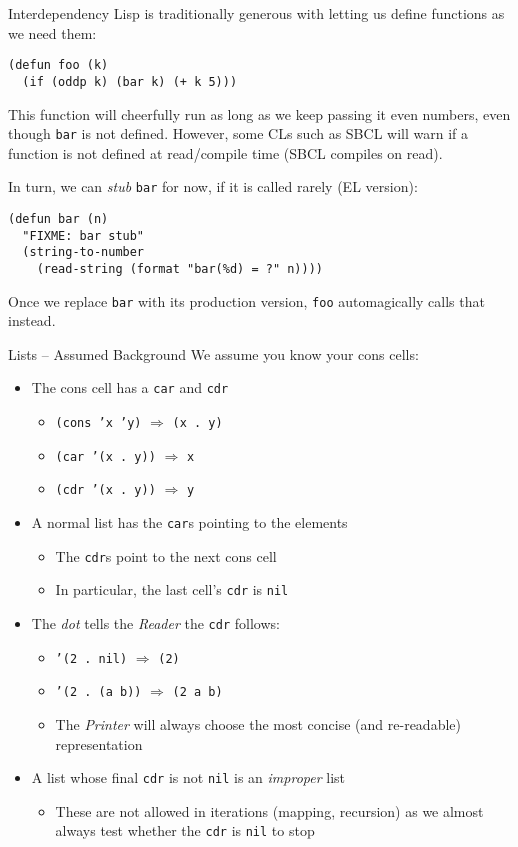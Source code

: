 \documentclass[presentation]{beamer}
\begin{document}
\begin{frame}[fragile]{Interdependency}
  Lisp is traditionally generous with letting us define functions as we need them:
\begin{verbatim}
(defun foo (k)
  (if (oddp k) (bar k) (+ k 5)))
\end{verbatim}
This function will cheerfully run as long as we keep passing it even numbers, even though \texttt{bar} is not defined.  However, some CLs such as SBCL will warn if a function is not defined at read/compile time (SBCL compiles on read).

\medskip
In turn, we can \emph{stub} \texttt{bar} for now, if it is called rarely (EL version):
\begin{verbatim}
(defun bar (n)
  "FIXME: bar stub"
  (string-to-number
    (read-string (format "bar(%d) = ?" n))))
\end{verbatim}
  Once we replace \texttt{bar} with its production version, \texttt{foo} automagically calls that instead.
\end{frame}


\begin{frame}[fragile]{Lists -- Assumed Background}
  We assume you know your cons cells:
  \begin{itemize}
  \item The cons cell has a \texttt{car} and \texttt{cdr}
    \begin{itemize}
    \item \texttt{(cons 'x 'y)} $\Rightarrow$ \texttt{(x . y)} 
    \item \texttt{(car '(x . y))} $\Rightarrow$ \texttt{x} 
    \item \texttt{(cdr '(x . y))} $\Rightarrow$ \texttt{y} 
    \end{itemize}
  \item A normal list has the \texttt{car}s pointing to the elements
    \begin{itemize}
    \item The \texttt{cdr}s point to the next cons cell
    \item In particular, the last cell's \texttt{cdr} is \texttt{nil}
    \end{itemize}
  \item The \emph{dot} tells the \emph{Reader} the \texttt{cdr} follows:
    \begin{itemize}
    \item \texttt{'(2 . nil)} $\Rightarrow$ \texttt{(2)}
    \item \texttt{'(2 . (a b))} $\Rightarrow$ \texttt{(2 a b)}
    \item The \emph{Printer} will always choose the most concise (and re-readable) representation
    \end{itemize}
  \item A list whose final \texttt{cdr} is not \texttt{nil} is an \emph{improper} list
    \begin{itemize}
    \item These are not allowed in iterations (mapping, recursion) as we almost always test whether the \texttt{cdr} is \texttt{nil} to stop
    \end{itemize}
  \end{itemize}
\end{frame}
\end{document}
